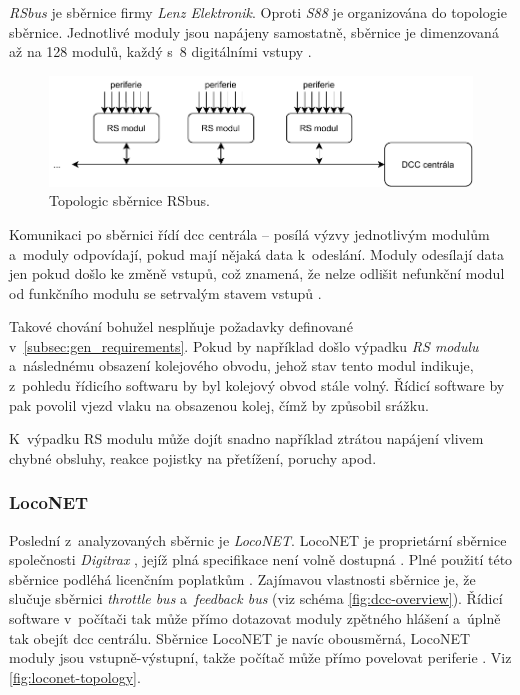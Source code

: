 \textit{RSbus} je sběrnice firmy \textit{Lenz Elektronik}. Oproti \textit{S88}
je organizována do topologie sběrnice. Jednotlivé moduly jsou napájeny
samostatně, sběrnice je dimenzovaná až na 128 modulů, každý s~8 digitálními
vstupy \cite{rs:web} \cite{rs_lib:web}.

\begin{figure}[ht!]
\includegraphics[width=\textwidth]{data/rs.pdf}
\caption{Topologic sběrnice RSbus.}
\label{fig:rs-topology}
\end{figure}

Komunikaci po sběrnici řídí \gls{dcc} centrála – posílá výzvy jednotlivým
modulům a~moduly odpovídají, pokud mají nějaká data k~odeslání. Moduly odesílají
data jen pokud došlo ke změně vstupů, což znamená, že nelze odlišit nefunkční
modul od funkčního modulu se setrvalým stavem vstupů \cite{rs_lib:web}.

Takové chování bohužel nesplňuje požadavky definované
v~\ref{subsec:gen_requirements}. Pokud by například došlo výpadku \textit{RS
modulu} a~následnému obsazení kolejového obvodu, jehož stav tento modul indikuje,
z~pohledu řídicího softwaru by byl kolejový obvod stále volný. Řídicí software
by pak povolil vjezd vlaku na obsazenou kolej, čímž by způsobil srážku.

K~výpadku RS modulu může dojít snadno například ztrátou napájení vlivem chybné
obsluhy, reakce pojistky na přetížení, poruchy apod.

\subsubsection{LocoNET}

Poslední z~analyzovaných sběrnic je \textit{LocoNET}. LocoNET je
proprietární sběrnice společnosti \textit{Digitrax} \cite{loconet:web}, jejíž
plná specifikace není volně dostupná \cite{loconet_license:web}.  Plné použití
této sběrnice podléhá licenčním poplatkům \cite{loconet_license:web}.
Zajímavou vlastnosti sběrnice je, že slučuje sběrnici \textit{throttle bus}
a~\textit{feedback bus} (viz schéma \ref{fig:dcc-overview}). Řídicí software
v~počítači tak může přímo dotazovat moduly zpětného hlášení a~úplně tak obejít
\gls{dcc} centrálu. Sběrnice LocoNET je navíc obousměrná,
LocoNET moduly jsou vstupně-výstupní, takže počítač může přímo
povelovat periferie \cite{loconet:web}. Viz \ref{fig:loconet-topology}.

